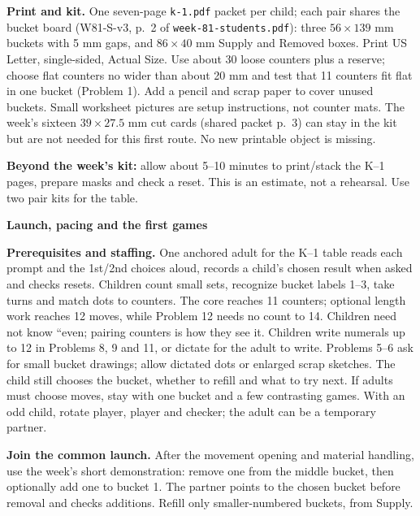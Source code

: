\documentclass[11pt]{article}
\newcommand{\head}[1]{\par\textbf{\large #1}\par}
\begin{document}
\textbf{Print and kit.} One seven-page \texttt{k-1.pdf} packet per child; each pair shares the bucket board (W81-S-v3, p.\ 2 of \texttt{week-81-students.pdf}): three $56\times139$ mm buckets with 5 mm gaps, and $86\times40$ mm Supply and Removed boxes. Print US Letter, single-sided, Actual Size. Use about 30 loose counters plus a reserve; choose flat counters no wider than about 20 mm and test that 11 counters fit flat in one bucket (Problem 1). Add a pencil and scrap paper to cover unused buckets. Small worksheet pictures are setup instructions, not counter mats. The week's sixteen $39\times27.5$ mm cut cards (shared packet p.\ 3) can stay in the kit but are not needed for this first route. No new printable object is missing.

\textbf{Beyond the week's kit:} allow about 5--10 minutes to print/stack the K--1 pages, prepare masks and check a reset. This is an estimate, not a rehearsal. Use two pair kits for the table.
\newpage
\head{Launch, pacing and the first games}
\textbf{Prerequisites and staffing.} One anchored adult for the K--1 table reads each prompt and the 1st/2nd choices aloud, records a child's chosen result when asked and checks resets. Children count small sets, recognize bucket labels 1--3, take turns and match dots to counters. The core reaches 11 counters; optional length work reaches 12 moves, while Problem 12 needs no count to 14. Children need not know ``even; pairing counters is how they see it. Children write numerals up to 12 in Problems 8, 9 and 11, or dictate for the adult to write. Problems 5--6 ask for small bucket drawings; allow dictated dots or enlarged scrap sketches. The child still chooses the bucket, whether to refill and what to try next. If adults must choose moves, stay with one bucket and a few contrasting games. With an odd child, rotate player, player and checker; the adult can be a temporary partner.

\textbf{Join the common launch.} After the movement opening and material handling, use the week's short demonstration: remove one from the middle bucket, then optionally add one to bucket 1. The partner points to the chosen bucket before removal and checks additions. Refill only smaller-numbered buckets, from Supply.
\end{document}
